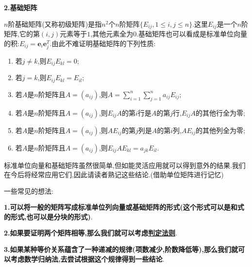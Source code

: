 \documentclass[../../main.tex]{subfiles}
\begin{document}
\begin{proposition}[标准单位向量和基础矩阵]
\large{\textbf{2.基础矩阵}}

\(n\)阶基础矩阵(又称初级矩阵)是指\(n^{2}\)个\(n\)阶矩阵\(\{E_{ij}, 1\leq i,j\leq n\}\).这里\(E_{ij}\)是一个\(n\)阶矩阵,它的第\((i,j)\)元素等于\(1\),其他元素全为\(0\).基础矩阵也可以看成是标准单位向量的积:\(E_{ij}=\boldsymbol{e}_{i}\boldsymbol{e}_{j}^{T}\).由此不难证明基础矩阵的下列性质:
\begin{enumerate}
\item 若\(j\neq k\),则\(E_{ij}E_{kl} = 0\);

\item  若\(j = k\),则\(E_{ij}E_{kl}=E_{il}\);

\item  若\(A\)是\(n\)阶矩阵且\(A=(a_{ij})\),则\(A=\sum_{i = 1}^{n}\sum_{j = 1}^{n}a_{ij}E_{ij}\);

\item  若\(A\)是\(n\)阶矩阵且\(A=(a_{ij})\),则\(E_{ij}A\)的第\(i\)行是\(A\)的第\(j\)行,\(E_{ij}A\)的其他行全为零;

\item  若\(A\)是\(n\)阶矩阵且\(A=(a_{ij})\),则\(AE_{ij}\)的第\(j\)列是\(A\)的第\(i\)列,\(AE_{ij}\)的其他列全为零;

\item  若\(A\)是\(n\)阶矩阵且\(A=(a_{ij})\),则\(E_{ij}AE_{kl}=a_{jk}E_{il}\).
\end{enumerate}
\end{proposition}
\begin{note}
标准单位向量和基础矩阵虽然很简单,但如能灵活应用就可以得到意外的结果.我们在今后将经常应用它们,因此请读者熟记这些结论.(借助单位矩阵进行记忆)

一些常见的想法:

\textbf{1.可以将一般的矩阵写成标准单位列向量或基础矩阵的形式(这个形式可以是和式的形式,也可以是分块的形式)}.

\textbf{2.如果要证明两个矩阵相等,那么我们就可以考虑\hyperlink{proposition:矩阵相等的判定法则}{判定法则}}.

\textbf{3.如果某种等价关系蕴含了一种递减的规律(项数减少,阶数降低等),那么我们就可以考虑数学归纳法,去尝试根据这个规律得到一些结论}.
\end{note}
\end{document}
